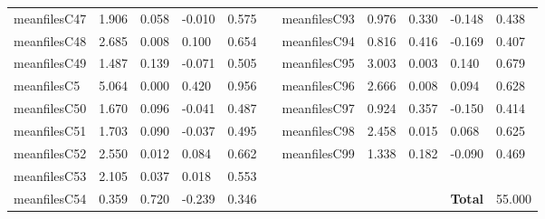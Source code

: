 \begin{table}[h!]
\begin{tabular}{lllllllllll}
meanfilesC47  & 1.906            & 0.058            & -0.010              & 0.575               &           & meanfilesC93  & 0.976            & 0.330            & -0.148              & 0.438               \\
meanfilesC48  & 2.685            & 0.008            & 0.100               & 0.654               &           & meanfilesC94  & 0.816            & 0.416            & -0.169              & 0.407               \\
meanfilesC49  & 1.487            & 0.139            & -0.071              & 0.505               &           & meanfilesC95  & 3.003            & 0.003            & 0.140               & 0.679               \\
meanfilesC5   & 5.064            & 0.000            & 0.420               & 0.956               &           & meanfilesC96  & 2.666            & 0.008            & 0.094               & 0.628               \\
meanfilesC50  & 1.670            & 0.096            & -0.041              & 0.487               &           & meanfilesC97  & 0.924            & 0.357            & -0.150              & 0.414               \\
meanfilesC51  & 1.703            & 0.090            & -0.037              & 0.495               &           & meanfilesC98  & 2.458            & 0.015            & 0.068               & 0.625               \\
meanfilesC52  & 2.550            & 0.012            & 0.084               & 0.662               &           & meanfilesC99  & 1.338            & 0.182            & -0.090              & 0.469               \\ \cline{7-11} 
meanfilesC53  & 2.105            & 0.037            & 0.018               & 0.553               &           &               &                  &                  &                     &                     \\
meanfilesC54  & 0.359            & 0.720            & -0.239              & 0.346               &           &               &                  &                  & \textbf{Total}      & 55.000             
\end{tabular}
\end{table}

